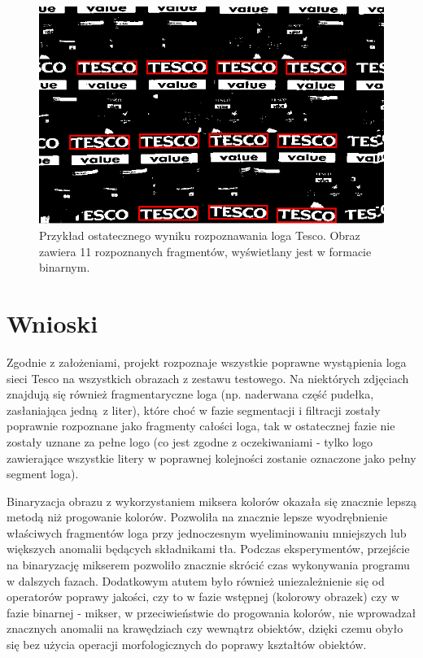 \documentclass[11pt,a4paper]{article} %
\numberwithin{equation}{section} %
\numberwithin{figure}{section} %
\numberwithin{table}{section} %
\begin{document}
\begin{figure}
	\centering
	\includegraphics[width=14cm]{pobr_proj_bin1.png}
	\caption{Przykład ostatecznego wyniku rozpoznawania loga Tesco. Obraz zawiera 11 rozpoznanych fragmentów, wyświetlany jest w formacie binarnym.}
	\label{fig:pobr_proj_bin1}
\end{figure}

\section{Wnioski}

Zgodnie z założeniami, projekt rozpoznaje wszystkie poprawne wystąpienia loga sieci Tesco na wszystkich obrazach z zestawu testowego. Na niektórych zdjęciach znajdują się również fragmentaryczne loga (np. naderwana część pudełka, zasłaniająca jedną z liter), które choć w fazie segmentacji i filtracji zostały poprawnie rozpoznane jako fragmenty całości loga, tak w ostatecznej fazie nie zostały uznane za pełne logo (co jest zgodne z oczekiwaniami - tylko logo zawierające wszystkie litery w poprawnej kolejności zostanie oznaczone jako pełny segment loga).

Binaryzacja obrazu z wykorzystaniem miksera kolorów okazała się znacznie lepszą metodą niż progowanie kolorów. Pozwoliła na znacznie lepsze wyodrębnienie właściwych fragmentów loga przy jednoczesnym wyeliminowaniu mniejszych lub większych anomalii będących składnikami tła. Podczas eksperymentów, przejście na binaryzację mikserem pozwoliło znacznie skrócić czas wykonywania programu w dalszych fazach. Dodatkowym atutem było również uniezależnienie się od operatorów poprawy jakości, czy to w fazie wstępnej (kolorowy obrazek) czy w fazie binarnej - mikser, w przeciwieństwie do progowania kolorów, nie wprowadzał znacznych anomalii na krawędziach czy wewnątrz obiektów, dzięki czemu obyło się bez użycia operacji morfologicznych do poprawy kształtów obiektów.
\end{document}
